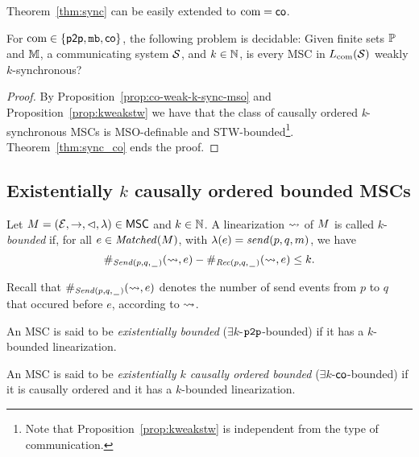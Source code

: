 Theorem~\ref{thm:sync} can be easily extended to $\textup{com} = \mathsf{co}$.

\begin{theorem}\label{thm:co-weak-k-sync}
For $\textup{com} \in \{\mathsf{p2p}, \mathtt{mb},\mathsf{co}\}$, the following problem is decidable:
Given finite sets $\mathbb{P}$ and $\mathbb{M}$, a communicating system $\mathcal{S}$, and $k \in \mathbb{N}$,
is every MSC in $L_{\textup{com}}(\mathcal{S})$ weakly $k$-synchronous?
\end{theorem}
\begin{proof}
By Proposition~\ref{prop:co-weak-k-sync-mso} and Proposition~\ref{prop:kweakstw} we have that the class of causally ordered \emph{k}-synchronous MSCs is MSO-definable and STW-bounded\footnote{Note that Proposition~\ref{prop:kweakstw} is independent from the type of communication.}. Theorem~\ref{thm:sync_co} ends the proof.
\end{proof}

\subsection{Existentially \texorpdfstring{$k$}{k} causally ordered bounded MSCs} 

\begin{definition}
Let $M = (\mathcal{E},\to,\lhd,\lambda) \in \mathsf{MSC}$ and $k \in \mathbb{N}$.
A linearization $\rightsquigarrow$ of $M$ is called
$k$-\emph{bounded} if, for all $e \in \mathit{Matched}(M)$, with $\lambda(e) = \mathit{send}(p, q, m)$, we have
\[
\#_{{\mathit{Send}(p,q,\hspace{0.1em}\underline{\hspace{0.5em}}\hspace{0.1em})}}(\rightsquigarrow,e) - \#_{{\mathit{Rec}(p,q,\hspace{0.1em}\underline{\hspace{0.5em}}\hspace{0.1em})}}(\rightsquigarrow,e) \le k.
\]
\end{definition}
\noindent Recall that $\#_{{\mathit{Send}(p,q,\hspace{0.1em}\underline{\hspace{0.5em}}\hspace{0.1em})}}(\rightsquigarrow,e)$ denotes the number of send events from $p$ to $q$ that occured before $e$, according to $\rightsquigarrow$.

\begin{definition}\label{def:ex_k_pp_bounded}
	An MSC is said to be \emph{existentially \pp bounded} ($\exists k$-$\mathtt{p2p}$-bounded) if it has a $k$-bounded linearization.
\end{definition}

\begin{definition}\label{def:ex_k_co_bounded}
An MSC is said to be \emph{existentially $k$ causally ordered bounded} ($\exists k$-$\mathsf{co}$-bounded) if it is causally ordered and it has a $k$-bounded linearization.
\end{definition}

